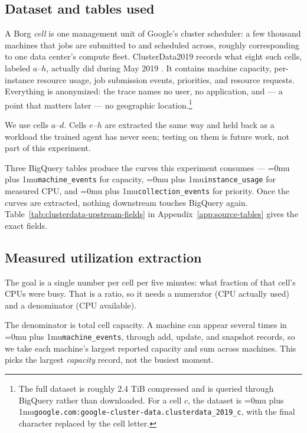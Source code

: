 ﻿\documentclass[12pt]{article}
\newcommand{\codepath}[1]{{\Urlmuskip=0mu plus 1mu\relax\nolinkurl{#1}}}
\begin{document}
\subsection{Dataset and tables used}
\label{subsec:clusterdata-role}

A Borg \emph{cell} is one management unit of Google's cluster scheduler: a few
thousand machines that jobs are submitted to and scheduled across, roughly
corresponding to one data center's compute fleet. ClusterData2019 records what
eight such cells, labeled \(a\)--\(h\), actually did during May 2019
\cite{wilkes2020clusterdata2019}. It contains machine capacity, per-instance
resource usage, job submission events, priorities, and resource requests.
Everything is anonymized: the trace names no user, no application, and --- a
point that matters later --- no geographic location.\footnote{The full dataset
is roughly 2.4 TiB compressed and is queried through BigQuery rather than
downloaded. For a cell \(c\), the dataset is
\codepath{google.com:google-cluster-data.clusterdata_2019_c}, with the final
character replaced by the cell letter.}

We use cells \(a\)--\(d\). Cells \(e\)--\(h\) are extracted the same way and
held back as a workload the trained agent has never seen; testing on them is
future work, not part of this experiment.

Three BigQuery tables produce the curves this experiment consumes ---
\codepath{machine_events} for capacity, \codepath{instance_usage} for measured
CPU, and \codepath{collection_events} for priority. Once the curves are
extracted, nothing downstream touches BigQuery again.
Table~\ref{tab:clusterdata-upstream-fields} in
Appendix~\ref{app:source-tables} gives the exact fields.

\subsection{Measured utilization extraction}
\label{subsec:clusterdata-utilization}

The goal is a single number per cell per five minutes: what fraction of that
cell's CPUs were busy. That is a ratio, so it needs a numerator (CPU actually
used) and a denominator (CPU available).

The denominator is total cell capacity. A machine can appear several times in
\codepath{machine_events}, through add, update, and snapshot records, so we take
each machine's largest reported capacity and sum across machines. This picks the
largest \emph{capacity} record, not the busiest moment.
\end{document}
